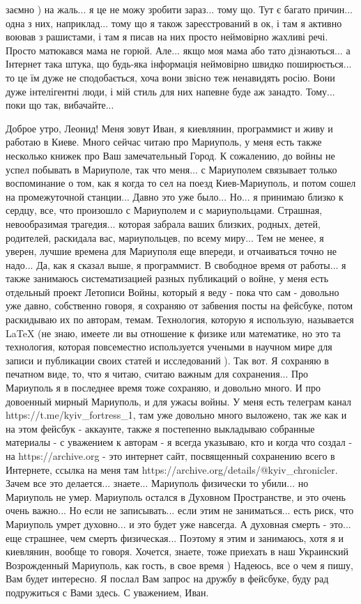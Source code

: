 заємно ) на жаль... я це не можу зробити зараз... тому що. Тут є багато
причин... одна з них, наприклад... тому що я також зареєстрований в ок, і там я
активно воював з рашистами, і там я писав на них просто неймовірно жахливі
речі. Просто матюкався мама не горюй. Але... якщо моя мама або тато
дізнаються... а Інтернет така штука, що будь-яка інформація неймовірно швидко
поширюється... то це їм дуже не сподобається, хоча вони звісно теж ненавидять
росію. Вони дуже інтелігентні люди, і мій стиль для них напевне буде аж
занадто. Тому... поки що так, вибачайте...

Доброе утро, Леонид! Меня зовут Иван, я киевлянин, программист и живу и работаю
в Киеве. Много сейчас читаю про Мариуполь, у меня есть также несколько книжек
про Ваш замечательный Город. К сожалению, до войны не успел побывать в
Мариуполе, так что меня... с Мариуполем связывает только воспоминание о том,
как я когда то сел на поезд Киев-Мариуполь, и потом сошел на промежуточной
станции... Давно это уже было... Но... я принимаю близко к сердцу, все, что
произошло с Мариуполем и с мариупольцами. Страшная, невообразимая трагедия...
которая забрала ваших близких, родных, детей, родителей, раскидала вас,
мариупольцев, по всему миру... Тем не менее, я уверен, лучшие времена для
Мариуполя еще впереди, и отчаиваться точно не надо... Да, как я сказал выше, я
программист. В свободное время от работы... я также занимаюсь систематизацией
разных публикаций о войне, у меня есть отдельный проект Летописи Войны, который
я веду - пока что сам - довольно уже давно, собственно говоря, я сохраняю от
забвения посты на фейсбуке, потом раскидываю их по авторам, темам. Технология,
которую я использую, называется LaTeX (не знаю, имеете ли вы отношение к физике
или математике, но это та технология, которая повсеместно используется учеными
в научном мире для записи и публикации своих статей и исследований ). Так вот.
Я сохраняю в печатном виде, то, что я читаю, считаю важным для сохранения...
Про Мариуполь я в последнее время тоже сохраняю, и довольно много. И про
довоенный мирный Мариуполь, и для ужасы войны. У меня есть телеграм канал
https://t.me/kyiv_fortress_1, там уже довольно много выложено, так же как и на
этом фейсбук - аккаунте, также я постепенно выкладываю собранные  материалы - с
уважением к авторам - я всегда указываю, кто и когда что создал - на
https://archive.org - это интернет сайт, посвященный сохранению всего в
Интернете, ссылка на меня там https://archive.org/details/@kyiv_chronicler.
Зачем все это делается... знаете... Мариуполь физически то убили... но
Мариуполь не умер. Мариуполь остался в Духовном Пространстве, и это очень очень
важно... Но если не записывать... если этим не заниматься... есть риск, что
Мариуполь умрет духовно... и это будет уже навсегда. А духовная смерть - это...
еще страшнее, чем смерть физическая... Поэтому я этим и занимаюсь, хотя я и
киевлянин, вообще то говоря. Хочется, знаете, тоже приехать в наш Украинский
Возрожденный Мариуполь, как гость, в свое время ) Надеюсь, все о чем я пишу,
Вам будет интересно. Я послал Вам запрос на дружбу в фейсбуке, буду рад
подружиться с Вами здесь. С уважением, Иван.

